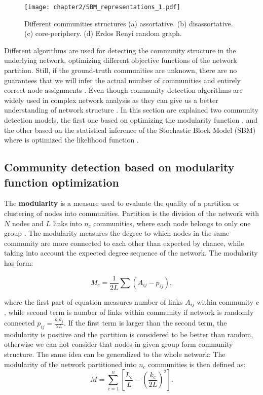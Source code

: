 \begin{figure}[h]
	\centering
	\texttt{[image: chapter2/SBM\_representations\_1.pdf]}
	\caption[Different communities structures.]{ Different communities structures  (a) assortative. (b) disassortative. (c) core-periphery. (d) Erdos Renyi random graph.}
	\label{fig:SBM}
\end{figure}

Different algorithms are used for detecting the community structure in the underlying network, optimizing different objective functions of the network partition. Still, if the ground-truth communities are unknown, there are no guarantees that we will infer the actual number of communities and entirely correct node assignments \cite{peel2017ground}. Even though community detection algorithms are widely used in complex network analysis as they can give us a better understanding of network structure \cite{peel2017ground, cherifi2019community}.  
In this section are explained two community detection models, the first one based on optimizing the modularity function \cite{fortunato2010community, guimera2004modularity}, and the other based on the statistical inference of the Stochastic Block Model (SBM) where is optimized the likelihood function \cite{fortunato2010community, lee2019review, peixoto2019bayesian}.

\subsection{Community detection based on modularity function optimization} 

The \textbf{modularity}  \cite{newman2004finding, guimera2004modularity, good2010performance}  is a measure used to evaluate the quality of a partition or clustering of nodes into communities. Partition is the division of the network with $N$ nodes and $L$ links into $n_c$ communities, where each node belongs to only one group \cite{barabasi2014network}. The modularity measures the degree to which nodes in the same community are more connected to each other than expected by chance, while taking into account the expected degree sequence of the network. The modularity has form: 

\begin{equation}
M_c = \frac{1}{2L}\sum(A_{ij}-p_{ij}),
\end{equation}

where the first part of equation measures number of links $A_{ij}$ within community $c$, while second term is number of links within community if network is randomly connected $p_{ij}= \frac{k_ik_j}{2L}$. If the first term is larger than the second term, the modularity is positive and the partition is considered to be better than random, otherwise we can not consider that nodes in given group form community structure. The same idea can be generalized to the whole network: The modularity of the network partitioned into $n_c$ communities is then defined as:
\begin{equation}
M=\sum_{c=1}^{n} [\frac{L_c}{L} - (\frac{k_c}{2L})^2].
\end{equation}



